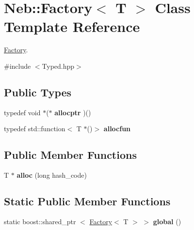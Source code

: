 \hypertarget{classNeb_1_1Factory}{\section{\-Neb\-:\-:\-Factory$<$ \-T $>$ \-Class \-Template \-Reference}
\label{classNeb_1_1Factory}
}


\hyperlink{classNeb_1_1Factory}{\-Factory}.  




{\ttfamily \#include $<$\-Typed.\-hpp$>$}

\subsection*{\-Public \-Types}
\begin{DoxyCompactItemize}
\item 
\hypertarget{classNeb_1_1Factory_a27acfb756f654d0cc21c7e8a6b087cb0}{typedef void $\ast$($\ast$ {\bfseries allocptr} )()}\label{classNeb_1_1Factory_a27acfb756f654d0cc21c7e8a6b087cb0}

\item 
\hypertarget{classNeb_1_1Factory_a1563001d6157ee7a3dec5adbb5f7a066}{typedef std\-::function$<$ \-T $\ast$()$>$ {\bfseries allocfun}}\label{classNeb_1_1Factory_a1563001d6157ee7a3dec5adbb5f7a066}

\end{DoxyCompactItemize}
\subsection*{\-Public \-Member \-Functions}
\begin{DoxyCompactItemize}
\item 
\hypertarget{classNeb_1_1Factory_acf737fbedc2c0ce6583dd7144947d51b}{\-T $\ast$ {\bfseries alloc} (long hash\-\_\-code)}\label{classNeb_1_1Factory_acf737fbedc2c0ce6583dd7144947d51b}

\end{DoxyCompactItemize}
\subsection*{\-Static \-Public \-Member \-Functions}
\begin{DoxyCompactItemize}
\item 
\hypertarget{classNeb_1_1Factory_a8d30d92c97c32b968d95e5b503ab5f7d}{static boost\-::shared\-\_\-ptr\*
$<$ \hyperlink{classNeb_1_1Factory}{\-Factory}$<$ \-T $>$ $>$ {\bfseries global} ()}\label{classNeb_1_1Factory_a8d30d92c97c32b968d95e5b503ab5f7d}

\end{DoxyCompactItemize}
